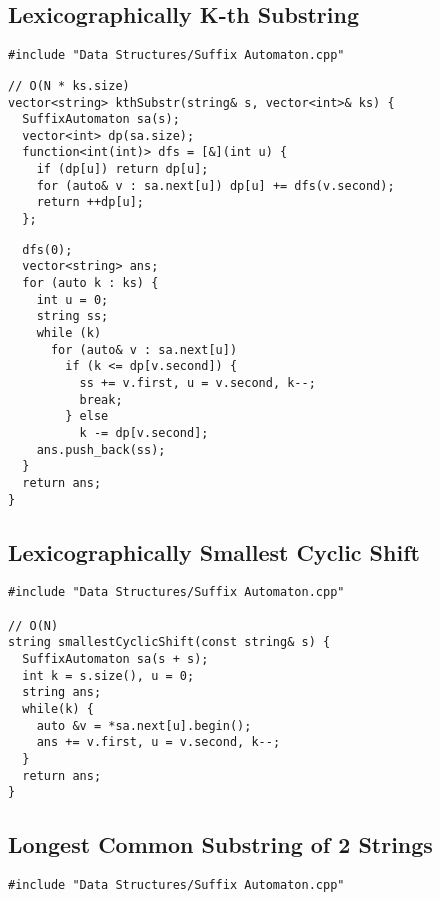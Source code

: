 \documentclass[twoside]{article}
\begin{document}
\begin{multicols*}{2}
\subsection*{Lexicographically K-th Substring}
\begin{verbatim}
#include "Data Structures/Suffix Automaton.cpp"
\end{verbatim}
\vspace{-12pt}
\begin{verbatim}
// O(N * ks.size)
vector<string> kthSubstr(string& s, vector<int>& ks) {
  SuffixAutomaton sa(s);
  vector<int> dp(sa.size);
  function<int(int)> dfs = [&](int u) {
    if (dp[u]) return dp[u];
    for (auto& v : sa.next[u]) dp[u] += dfs(v.second);
    return ++dp[u];
  };
\end{verbatim}
\vspace{-12pt}
\begin{verbatim}
  dfs(0);
  vector<string> ans;
  for (auto k : ks) {
    int u = 0;
    string ss;
    while (k)
      for (auto& v : sa.next[u])
        if (k <= dp[v.second]) {
          ss += v.first, u = v.second, k--;
          break;
        } else
          k -= dp[v.second];
    ans.push_back(ss);
  }
  return ans;
}
\end{verbatim}

\subsectionfont{\large\bfseries\sffamily\underline}
\subsection*{Lexicographically Smallest Cyclic Shift}
\begin{verbatim}
#include "Data Structures/Suffix Automaton.cpp"

// O(N)
string smallestCyclicShift(const string& s) {
  SuffixAutomaton sa(s + s);
  int k = s.size(), u = 0;
  string ans;
  while(k) {
    auto &v = *sa.next[u].begin();
    ans += v.first, u = v.second, k--;
  }
  return ans;
}
\end{verbatim}

\subsectionfont{\large\bfseries\sffamily\underline}
\subsection*{Longest Common Substring of 2 Strings}
\begin{verbatim}
#include "Data Structures/Suffix Automaton.cpp"


\end{verbatim}
\end{multicols*}
\end{document}
